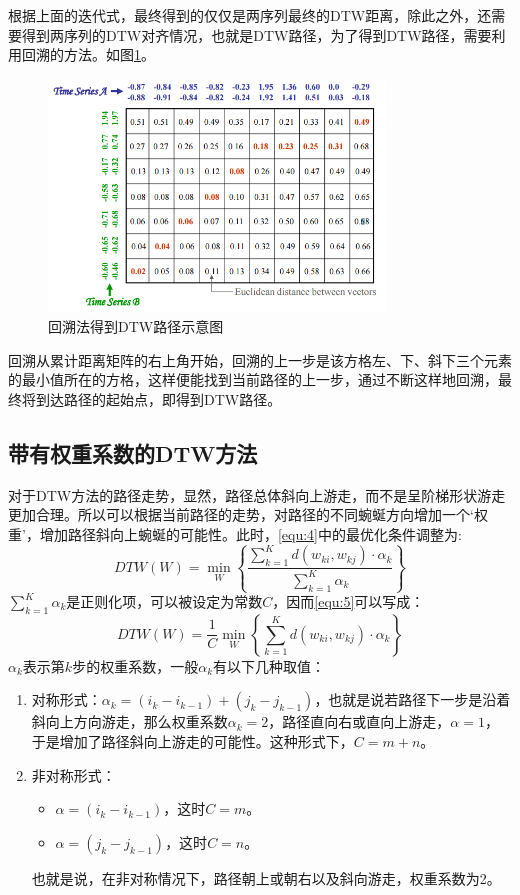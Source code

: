 根据上面的迭代式，最终得到的仅仅是两序列最终的DTW距离，除此之外，还需要得到两序列的DTW对齐情况，也就是DTW路径，为了得到DTW路径，需要利用回溯的方法。如图\ref{fig:6}。
\begin{figure}[h]
  \centering
  \includegraphics[width=0.8\textwidth]{./figure/trace_back.PNG}
  \caption{回溯法得到DTW路径示意图}\label{fig:6}
\end{figure}
回溯从累计距离矩阵的右上角开始，回溯的上一步是该方格左、下、斜下三个元素的最小值所在的方格，这样便能找到当前路径的上一步，通过不断这样地回溯，最终将到达路径的起始点，即得到DTW路径。

\subsection{带有权重系数的DTW方法}
对于DTW方法的路径走势，显然，路径总体斜向上游走，而不是呈阶梯形状游走更加合理。所以可以根据当前路径的走势，对路径的不同蜿蜒方向增加一个‘权重’，增加路径斜向上蜿蜒的可能性。此时，\ref{equ:4}中的最优化条件调整为:
\begin{equation}\label{equ:5}
  DTW(W) = \mathop {\min }\limits_W \left\{ {\frac{{\sum\limits_{k = 1}^K {d\left( {{w_{ki}},{w_{kj}}} \right) \cdot {\alpha _k}} }}{{\sum\limits_{k = 1}^K {{\alpha _k}} }}} \right\}
\end{equation}
${\sum\limits_{k = 1}^K {{\alpha _k}} }$是正则化项，可以被设定为常数$C$，因而\ref{equ:5}可以写成：
\begin{equation}\label{equ:6}
  DTW(W) = \frac{1}{C}\mathop {\min }\limits_W \left\{ {\sum\limits_{k = 1}^K {d\left( {{w_{ki}},{w_{kj}}} \right) \cdot {\alpha _k}} } \right\}
\end{equation}
$\alpha_k$表示第$k$步的权重系数，一般$\alpha_k$有以下几种取值：
\begin{enumerate}
  \item 对称形式：$\alpha_k = (i_k - i_{k-1})+(j_k - j_{k-1})$，也就是说若路径下一步是沿着斜向上方向游走，那么权重系数$\alpha_k = 2$，路径直向右或直向上游走，$\alpha = 1$，于是增加了路径斜向上游走的可能性。这种形式下，$C = m+n$。
  \item 非对称形式：
  \begin{itemize}
          \item $\alpha = (i_k - i_{k-1})$，这时$C = m$。
          \item $\alpha = (j_k - j_{k-1})$，这时$C = n$。
  \end{itemize}
  也就是说，在非对称情况下，路径朝上或朝右以及斜向游走，权重系数为2。
\end{enumerate}

